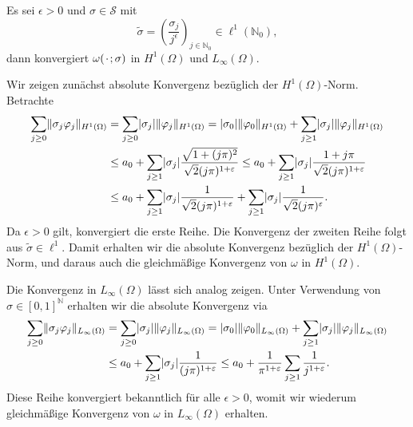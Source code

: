 \begin{Lemma}
    Es sei $\epsilon > 0$ und $\sigma \in \mathcal S$ mit
    \begin{equation}
        \label{eq:sigma_tilde}
        \tilde \sigma = \left(  \frac{\sigma_{j}}{j^{\epsilon}} \right)_{j \in \mathbb{N}_{0}} \in \ell^{1}(\mathbb{N}_{0}),
    \end{equation}
    dann konvergiert $\omega({\mkern2mu\cdot\mkern2mu}; \sigma)$ in $H^{1}(\Omega)$ und $L_{\infty}(\Omega)$.

    \begin{Beweis}
        Wir zeigen zunächst absolute Konvergenz bezüglich der $H^{1}(\Omega)$-Norm.
        Betrachte
        \begin{align}
            \sum_{j \geq 0} \lVert\sigma_{j} \varphi_{j}\rVert_{H^{1}(\Omega)}
            &= \sum_{j \geq 0} \lvert\sigma_{j}\rvert \lVert\varphi_{j}\rVert_{H^{1}(\Omega)}
            = \lvert\sigma_{0}\rvert \lVert\varphi_{0}\rVert_{H^{1}(\Omega)} + \sum_{j \geq 1} \lvert\sigma_{j}\rvert \lVert\varphi_{j}\rVert_{H^{1}(\Omega)}
            \\&\leq a_{0} + \sum_{j \geq 1} \lvert\sigma_{j}\rvert \frac{\sqrt{1 + (j \pi)^{2}}}{\sqrt{2}(j \pi)^{1+\varepsilon}}
            \leq a_{0} + \sum_{j \geq 1} \lvert\sigma_{j}\rvert \frac{1 + j \pi}{\sqrt{2}(j \pi)^{1+\varepsilon}}
            \\&\leq a_{0} + \sum_{j \geq 1} \lvert\sigma_{j}\rvert \frac{1}{\sqrt{2}(j \pi)^{1+\varepsilon}} + \sum_{j \geq 1} \lvert\sigma_{j}\rvert \frac{1}{\sqrt{2}(j \pi)^{\varepsilon}}.
        \end{align}
        Da $\epsilon > 0$ gilt, konvergiert die erste Reihe.
        Die Konvergenz der zweiten Reihe folgt aus $\tilde \sigma \in \ell^{1}$.
        Damit erhalten wir die absolute Konvergenz bezüglich der $H^{1}(\Omega)$-Norm, und daraus auch die gleichmäßige Konvergenz von $\omega$ in $H^{1}(\Omega)$.

        Die Konvergenz in $L_{\infty}(\Omega)$ lässt sich analog zeigen.
        Unter Verwendung von $\sigma \in [0, 1]^{\mathbb{N}}$ erhalten wir die absolute Konvergenz via
        \begin{align}
            \sum_{j \geq 0} \lVert\sigma_{j} \varphi_{j}\rVert_{L_{\infty}(\Omega)}
            &= \sum_{j \geq 0} \lvert\sigma_{j}\rvert \lVert\varphi_{j}\rVert_{L_{\infty}(\Omega)}
             = \lvert\sigma_{0}\rvert \lVert\varphi_{0}\rVert_{L_{\infty}(\Omega)} + \sum_{j \geq 1} \lvert\sigma_{j}\rvert \lVert\varphi_{j}\rVert_{L_{\infty}(\Omega)}
            \\&\leq a_{0} + \sum_{j \geq 1} \lvert\sigma_{j}\rvert \frac{1}{(j \pi)^{1+\varepsilon}}
               \leq a_{0} + \frac{1}{\pi^{1+\varepsilon}} \sum_{j \geq 1} \frac{1}{j^{1+\varepsilon}}.
        \end{align}
        Diese Reihe konvergiert bekanntlich für alle $\epsilon > 0$, womit wir wiederum gleichmäßige Konvergenz von $\omega$ in $L_{\infty}(\Omega)$ erhalten.
    \end{Beweis}
\end{Lemma}

